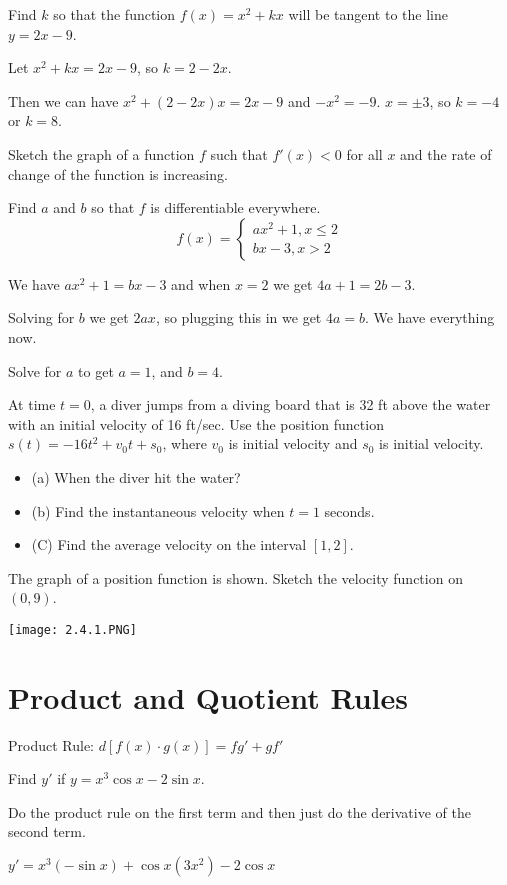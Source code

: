 \documentclass[../bccalc.tex]{subfiles}
\begin{document}
\begin{example}
    Find $k$ so that the function $f(x)=x^2+kx$ will be tangent to the line $y=2x-9$.

    Let $x^2+kx=2x-9$, so $k=2-2x$.

    Then we can have $x^2+(2-2x)x=2x-9$ and $-x^2=-9$. $x=\pm 3$, so $k=-4$ or $k=8$.
\end{example}

\ex Sketch the graph of a function $f$ such that $f'(x)<0$ for all $x$ and the rate of change of the function is increasing.

\begin{example}
    Find $a$ and $b$ so that $f$ is differentiable everywhere.
    \[ f(x)=\begin{cases}
        ax^2+1, x\leq 2 \\ bx-3, x>2
    \end{cases} \]

    We have $ax^2+1=bx-3$ and when $x=2$ we get $4a+1=2b-3$.

    Solving for $b$ we get $2ax$, so plugging this in we get $4a=b$. We have everything now.

    Solve for $a$ to get $a=1$, and $b=4$.
\end{example}

\ex At time $t=0$, a diver jumps from a diving board that is 32 ft above the water with an initial velocity of 16 ft/sec. Use the position function $s(t)=-16t^2+v_0t+s_0$, where $v_0$ is initial velocity and $s_0$ is initial velocity. \begin{itemize}
    \item (a) When the diver hit the water?
    \item (b) Find the instantaneous velocity when $t=1$ seconds.
    \item (C) Find the average velocity on the interval $[1,2]$.
\end{itemize}

\ex The graph of a position function is shown. Sketch the velocity function on $(0,9)$.
\begin{center}
    \texttt{[image: 2.4.1.PNG]}
\end{center}

\section{Product and Quotient Rules}
Product Rule: $d[f(x)\cdot g(x)] = fg'+gf'$

\begin{example}
    Find $y'$ if $y=x^3\cos x-2\sin x$.

    Do the product rule on the first term and then just do the derivative of the second term.

    $y'=x^3(-\sin x)+\cos x(3x^2)-2\cos x$
\end{example}
\end{document}
